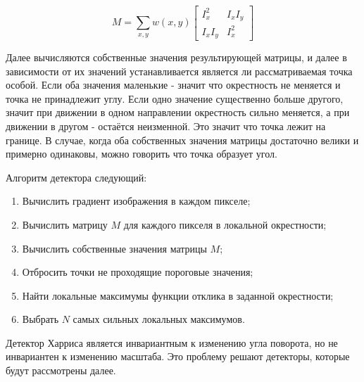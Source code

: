 \begin{equation}
    M = \sum_{x, y} w(x, y) \begin{bmatrix} I_x^2 & I_x I_y \\ I_x I_y & I_x^2 \end{bmatrix}
\end{equation}

Далее вычисляются собственные значения результирующей матрицы, и далее в зависимости от их значений устанавливается является ли рассматриваемая точка особой. Если оба значения маленькие - значит что окрестность не меняется и точка не принадлежит углу. Если одно значение существенно больше другого, значит при движении в одном направлении окрестность сильно меняется, а при движении в другом - остаётся неизменной. Это значит что точка лежит на границе. В случае, когда оба собственных значения матрицы достаточно велики и примерно одинаковы, можно говорить что точка образует угол.

\vspace{1em}
Алгоритм детектора следующий:
\begin{enumerate}
    \item Вычислить градиент изображения в каждом пикселе;
    \item Вычислить матрицу $M$ для каждого пикселя в локальной окрестности;
    \item Вычислить собственные значения матрицы $M$;
    \item Отбросить точки не проходящие пороговые значения;
    \item Найти локальные максимумы функции отклика в заданной окрестности;
    \item Выбрать $N$ самых сильных локальных максимумов.
\end{enumerate}

\vspace{1em}
Детектор Харриса является инвариантным к изменению угла поворота, но не инвариантен к изменению масштаба. Это проблему решают детекторы, которые будут рассмотрены далее.